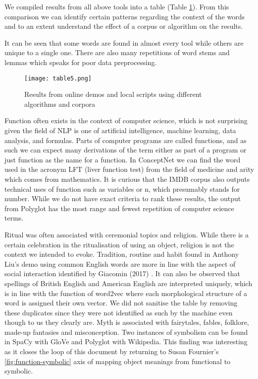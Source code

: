 \documentclass[12pt, usenames, dvipsnames]{report}
\begin{document}
\begin{flushleft}
We compiled results from all above tools into a table (Table \ref{tab:table5}).
From this comparison we can identify certain patterns regarding the context of the words and to an extent understand the effect of a corpus or algorithm on the results.

It can be seen that some words are found in almost every tool while others are unique to a single one.
There are also many repetitions of word stems and lemmas which speaks for poor data preprocessing.

\vspace*{1.2em}
\begin{figure}[!htbp]
  \hspace*{-3.666em}
  \texttt{[image: table5.png]}
  \caption{Results from online demos and local scripts using different algorithms and corpora}
  \label{tab:table5}
\end{figure}
\vspace*{1.2em}

Function often exists in the context of computer science, which is not surprising given the field of NLP is one of artificial intelligence, machine learning, data analysis, and formulas.
Parts of computer programs are called functions, and as such we can expect many derivations of the term either as part of a program or just function as the name for a function.
In ConceptNet we can find the word used in the acronym LFT (liver function test) from the field of medicine and arity which comes from mathematics.
It is curious that the IMDB corpus also outputs technical uses of function such as variables or n, which presumably stands for number.
While we do not have exact criteria to rank these results, the output from Polyglot has the most range and fewest repetition of computer science terms.

Ritual was often associated with ceremonial topics and religion.
While there is a certain celebration in the ritualisation of using an object, religion is not the context we intended to evoke.
Tradition, routine and habit found in Anthony Liu’s demo using common English words are more in line with the aspect of social interaction identified by Giacomin (2017) \cite{giacomin2017}.
It can also be observed that spellings of British English and American English are interpreted uniquely, which is in line with the function of word2vec where each morphological structure of a word is assigned their own vector.
We did not sanitise the table by removing these duplicates since they were not identified as such by the machine even though to us they clearly are.
Myth is associated with fairytales, fables, folklore, made-up fantasies and misconception.
Two instances of symbolism can be found in SpaCy with GloVe and Polyglot with Wikipedia.
This finding was interesting as it closes the loop of this document by returning to Susan Fournier’s \ref{fig:function-symbolic} axis of mapping object meanings from functional to symbolic.


\end{flushleft}
\end{document}
